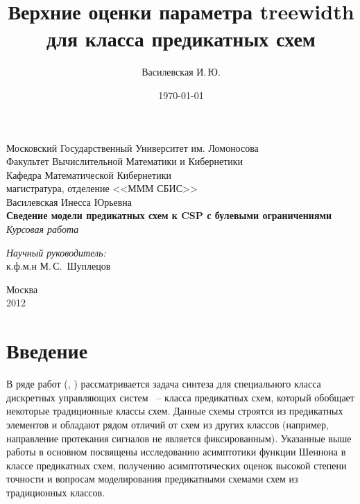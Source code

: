 \documentclass[12pt]{article}
\title{Верхние оценки параметра treewidth для класса предикатных схем}
\author{Василевская И.\,Ю.}
\date{\today}
\begin{document}
    \begin{titlepage}
        \begin{center}
            Московский Государственный Университет им. Ломоносова\\
            Факультет Вычислительной Математики и Кибернетики\\
            Кафедра Математической Кибернетики\\
            магистратура, отделение <<МММ СБИС>>\\[6cm]

            \large {Василевская Инесса Юрьевна}\\
            \LARGE \textbf {Сведение модели предикатных схем к CSP с булевыми ограничениями}\\[0.8cm]
            \large \emph {Курсовая работа}\\[5.0cm]

            \begin{flushright}
                \large
                \begin{minipage}{0.40\textwidth}
                    \begin{flushleft}
                        \emph{Научный руководитель:}\\к.ф.м.н М.\,С.~Шуплецов
                    \end{flushleft}
                \end{minipage}
            \end{flushright}

            \vfill
            Москва\\
			2012
        \end{center}
    \end{titlepage}

\setcounter{page}{2}

\tableofcontents

\section{Введение}
\label{beginning}
В ряде работ (\cite{Shu09}, \cite{Shu11}) рассматривается задача синтеза для специального класса дискретных управляющих систем ~--
класса предикатных схем, который обобщает некоторые традиционные классы схем. Данные схемы строятся из предикатных элементов
и обладают рядом отличий от схем из других классов (например, направление протекания сигналов не является фиксированным).
Указанные выше работы в основном посвящены исследованию асимптотики функции Шеннона в классе предикатных схем,
 получению асимптотических оценок высокой степени точности и вопросам моделирования предикатными схемами схем из традиционных классов.
\end{document}

